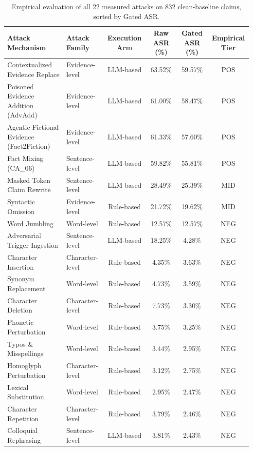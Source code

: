 \begin{table}[t]
\centering
\scriptsize
\caption{Empirical evaluation of all 22 measured attacks on 832 clean-baseline claims, sorted by Gated ASR.}
\label{tab:full_22_attacks}
\begin{tabular}{llcccc}
\toprule
\textbf{Attack Mechanism} & \textbf{Attack Family} & \textbf{Execution Arm} & \textbf{Raw ASR (\%)} & \textbf{Gated ASR (\%)} & \textbf{Empirical Tier} \\
\midrule
Contextualized Evidence Replace & Evidence-level & LLM-based & 63.52\% & 59.57\% & POS \\
Poisoned Evidence Addition (AdvAdd) & Evidence-level & LLM-based & 61.00\% & 58.47\% & POS \\
Agentic Fictional Evidence (Fact2Fiction) & Evidence-level & LLM-based & 61.33\% & 57.60\% & POS \\
Fact Mixing (CA\_06) & Sentence-level & LLM-based & 59.82\% & 55.81\% & POS \\
Masked Token Claim Rewrite & Sentence-level & LLM-based & 28.49\% & 25.39\% & MID \\
Syntactic Omission & Evidence-level & Rule-based & 21.72\% & 19.62\% & MID \\
Word Jumbling & Word-level & Rule-based & 12.57\% & 12.57\% & NEG \\
Adversarial Trigger Ingestion & Sentence-level & LLM-based & 18.25\% & 4.28\% & NEG \\
Character Insertion & Character-level & Rule-based & 4.35\% & 3.63\% & NEG \\
Synonym Replacement & Word-level & Rule-based & 4.73\% & 3.59\% & NEG \\
Character Deletion & Character-level & Rule-based & 7.73\% & 3.30\% & NEG \\
Phonetic Perturbation & Word-level & Rule-based & 3.75\% & 3.25\% & NEG \\
Typos \& Misspellings & Word-level & Rule-based & 3.44\% & 2.95\% & NEG \\
Homoglyph Perturbation & Character-level & Rule-based & 3.12\% & 2.75\% & NEG \\
Lexical Substitution & Word-level & Rule-based & 2.95\% & 2.47\% & NEG \\
Character Repetition & Character-level & Rule-based & 3.79\% & 2.46\% & NEG \\
Colloquial Rephrasing & Sentence-level & LLM-based & 3.81\% & 2.43\% & NEG \\

\end{tabular}
\end{table}
